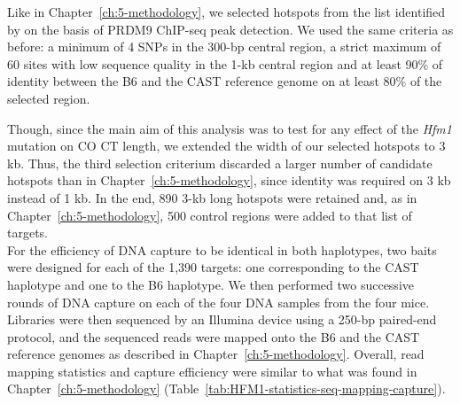 Like in Chapter~\ref{ch:5-methodology}, we selected hotspots from the list identified by \citet{baker2015prdm9} on the basis of PRDM9 ChIP-seq peak detection.
We used the same criteria as before: a minimum of 4 SNPs in the 300-bp central region, a strict maximum of 60 sites with low sequence quality in the 1-kb central region and at least 90\% of identity between the B6 and the CAST reference genome on at least 80\% of the selected region.

Though, since the main aim of this analysis was to test for any effect of the \textit{Hfm1} mutation on CO CT length, we extended the width of our selected hotspots to 3 kb.
Thus, the third selection criterium discarded a larger number of candidate hotspots than in Chapter~\ref{ch:5-methodology}, since identity was required on 3 kb instead of 1 kb.
In the end, 890 3-kb long hotspots were retained and, as in Chapter~\ref{ch:5-methodology}, 500 control regions were added to that list of targets.\\




For the efficiency of DNA capture to be identical in both haplotypes, two baits were designed for each of the 1,390 targets: one corresponding to the CAST haplotype and one to the B6 haplotype.
We then performed two successive rounds of DNA capture on each of the four DNA samples from the four mice.
Libraries were then sequenced by an Illumina device using a 250-bp paired-end protocol, and the sequenced reads were mapped onto the B6 and the CAST reference genomes as described in Chapter~\ref{ch:5-methodology}.
Overall, read mapping statistics and capture efficiency were similar to what was found in Chapter~\ref{ch:5-methodology} (Table~\ref{tab:HFM1-statistics-seq-mapping-capture}).




